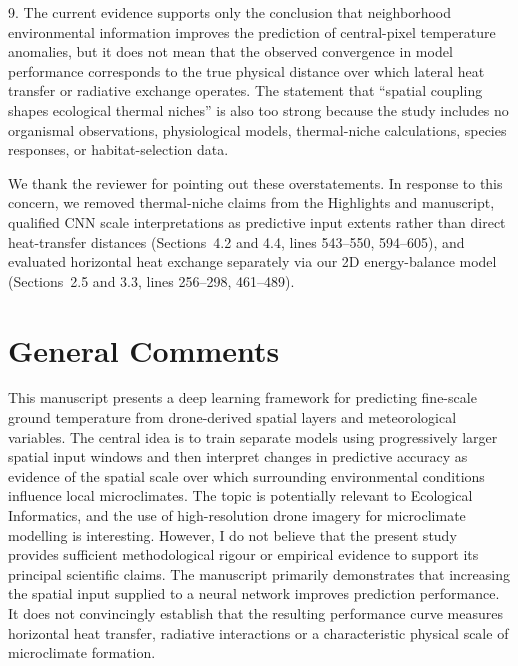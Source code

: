 \documentclass[12pt,english]{reviewresponse}
\begin{document}
\begin{revcomment}
9. The current evidence supports only the conclusion that neighborhood environmental information improves the prediction of central-pixel temperature anomalies, but it does not mean that the observed convergence in model performance corresponds to the true physical distance over which lateral heat transfer or radiative exchange operates. The statement that “spatial coupling shapes ecological thermal niches” is also too strong because the study includes no organismal observations, physiological models, thermal-niche calculations, species responses, or habitat-selection data.
\end{revcomment}

\begin{revresponse}
We thank the reviewer for pointing out these overstatements. In response to this concern, we removed thermal-niche claims from the Highlights and manuscript, qualified CNN scale interpretations as predictive input extents rather than direct heat-transfer distances (Sections~4.2 and 4.4, lines 543--550, 594--605), and evaluated horizontal heat exchange separately via our 2D energy-balance model (Sections~2.5 and 3.3, lines 256--298, 461--489).
\end{revresponse}

\clearpage

\reviewer

\section*{General Comments}

\begin{generalcomment}
This manuscript presents a deep learning framework for predicting fine-scale ground temperature from drone-derived spatial layers and meteorological variables. The central idea is to train separate models using progressively larger spatial input windows and then interpret changes in predictive accuracy as evidence of the spatial scale over which surrounding environmental conditions influence local microclimates. The topic is potentially relevant to Ecological Informatics, and the use of high-resolution drone imagery for microclimate modelling is interesting. However, I do not believe that the present study provides sufficient methodological rigour or empirical evidence to support its principal scientific claims. The manuscript primarily demonstrates that increasing the spatial input supplied to a neural network improves prediction performance. It does not convincingly establish that the resulting performance curve measures horizontal heat transfer, radiative interactions or a characteristic physical scale of microclimate formation.
\end{generalcomment}
\end{document}
